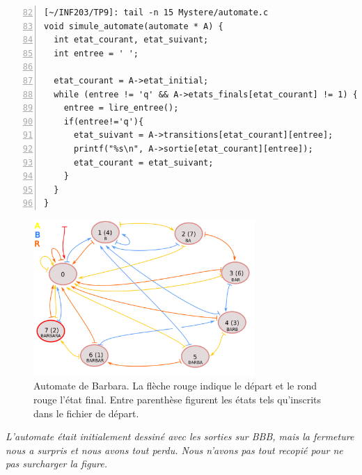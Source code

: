 \documentclass[12pt,a4paper,notitlepage,colorinlistoftodos]{article}
\begin{document}
\begin{lstlisting}[numbers=left, firstnumber = 82 ]
[~/INF203/TP9]: tail -n 15 Mystere/automate.c
void simule_automate(automate * A) {
  int etat_courant, etat_suivant;
  int entree = ' ';

  etat_courant = A->etat_initial;
  while (entree != 'q' && A->etats_finals[etat_courant] != 1) {
    entree = lire_entree();
    if(entree!='q'){
      etat_suivant = A->transitions[etat_courant][entree];
      printf("%s\n", A->sortie[etat_courant][entree]);
      etat_courant = etat_suivant;
    }
  }
}
\end{lstlisting}



\begin{figure}[h]
	\centering
	\includegraphics[width = 0.75\textwidth]{barbara.png}
	\caption{Automate de Barbara. La flèche rouge indique le départ et le rond rouge l'état final. Entre parenthèse figurent les états tels qu'inscrits dans le fichier de départ.}
\end{figure}

\textit{L'automate était initialement dessiné avec les sorties sur BBB, mais la fermeture nous a surpris et nous avons tout perdu. Nous n'avons pas tout recopié pour ne pas surcharger la figure.}

\cite{}


\end{document}
